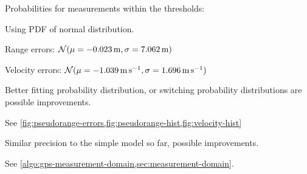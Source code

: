 \begin{compactitem}
\begin{compactitem}
\begin{compactitem}
        \item Probabilities for measurements within the thresholds:
        \begin{compactitem}
            \item Using PDF of normal distribution.
            \item Range errors:
                  \(\operatorname{\mathcal{N}}(\mu = \SI{-0.023}{\meter}, \sigma = \SI{7.062}{\meter})\)
            \item Velocity errors:
                  \(\operatorname{\mathcal{N}}(\mu = \SI{-1.039}{\meter\per\second}, \sigma = \SI{1.696}{\meter\per\second})\)
            \item Better fitting probability distribution, or switching probability distributions are possible improvements.
            \item See \cref{fig:pseudorange-errors,fig:pseudorange-hist,fig:velocity-hist}
        \end{compactitem}
    \end{compactitem}

    \item
    Similar precision to the simple model so far, possible improvements.

    \item
    See \cref{algo:gps-measurement-domain,sec:measurement-domain}.
\end{compactitem}
\end{compactitem}
